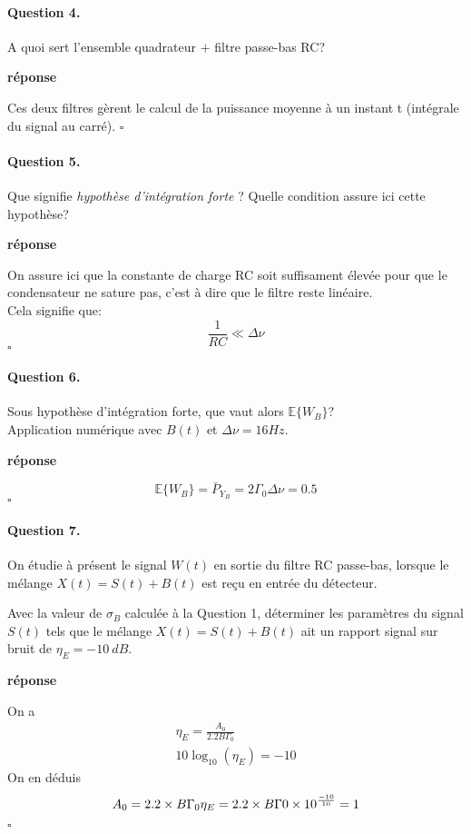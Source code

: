 \documentclass{article}
\newcommand{\dnu}{16}
\newcommand{\debutrep}[1]{\color{blue}\begin{center} \hrulefill \textbf{ #1 } \hrulefill \end{center} }
\newcommand{\finrep}{\vspace*{5mm}\hfill $\square$\color{black}\vspace*{5mm}}
\begin{document}
\paragraph{Question 4.}
A quoi sert l'ensemble {\sc quadrateur} $+$ {\sc filtre passe-bas RC}?

\debutrep{réponse}
Ces deux filtres gèrent le calcul de la puissance moyenne à un instant t (intégrale du signal au carré).
\finrep

\paragraph{Question 5.}
Que signifie {\em hypothèse d'intégration forte} ? Quelle condition assure ici cette hypothèse?
\debutrep{réponse}
On assure ici que la constante de charge RC soit suffisament élevée pour que le condensateur ne sature pas, c'est à dire que le filtre reste linéaire.\\
Cela signifie que:
$$
\frac{1}{RC} \ll \Delta \nu
$$
\finrep

 \paragraph{Question 6.}
Sous hypothèse d'intégration forte, que vaut  alors $\mathbb{E}\{W_B\}$? \\
Application numérique avec $B(t)$ et $\Delta\nu = \dnu Hz$.

\debutrep{réponse}
$$
\mathbb{E}\{W_B\}=\bar{P}_{Y_B}=2\Gamma_0 \Delta \nu = 0.5
$$
\finrep

\paragraph{Question 7.}
On étudie à présent le signal $W(t)$ en sortie du filtre RC passe-bas, lorsque le mélange $X(t) = S(t) + B(t)$ est reçu en entrée du détecteur.

Avec la valeur de $\sigma_B$ calculée à la Question 1, déterminer les paramètres du signal $S(t)$ tels que le mélange $X(t) = S(t)+B(t)$ ait un rapport signal sur bruit de $\eta_E = -10~dB$. 

\debutrep{réponse}
On a
\begin{gather}
    \eta_E = \frac{A_0}{2.2B\Gamma_0} \\
    10\log_{10}(\eta_E)=-10
\end{gather}
On en déduis
\[
A_0 = 2.2\times B\Gamma_0\eta_E = 2.2 \times B\Gamma0\times 10^{-10 \over 10}= 1
\]

\finrep
\end{document}

